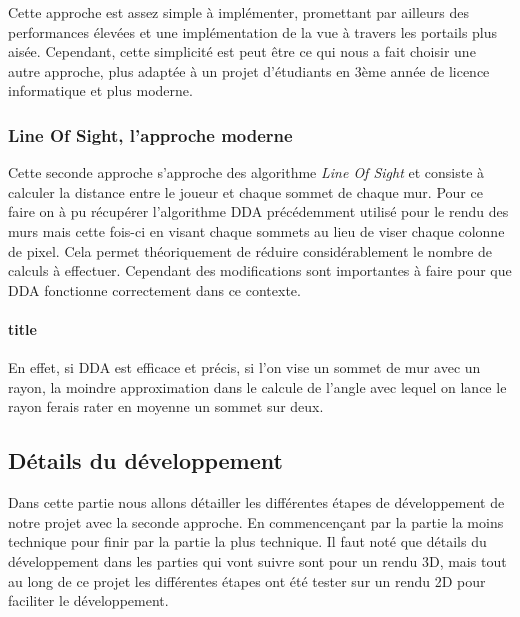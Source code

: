 \documentclass[12pt]{report}
\begin{document}
\noindent Cette approche est assez simple à implémenter, promettant par ailleurs des performances élevées et 
une implémentation de la vue à travers les portails plus aisée. Cependant, cette simplicité est peut être ce qui 
nous a fait choisir une autre approche, plus adaptée à un projet d'étudiants en 3ème année de licence informatique et plus moderne.

\subsubsection{Line Of Sight, l'approche moderne}

Cette seconde approche s'approche des algorithme \textit{Line Of Sight} et consiste à calculer la distance entre le joueur et chaque sommet de chaque mur.
Pour ce faire on à pu récupérer l'algorithme DDA précédemment utilisé pour le rendu des murs mais cette fois-ci 
en visant chaque sommets au lieu de viser chaque colonne de pixel. Cela permet théoriquement de réduire considérablement le nombre de calculs à effectuer.
Cependant des modifications sont importantes à faire pour que DDA fonctionne correctement dans ce contexte.

\paragraph{title}

En effet, si DDA est efficace et précis, si l'on vise un sommet de mur avec un rayon, la moindre approximation dans le calcule de l'angle avec lequel on 
lance le rayon ferais rater en moyenne un sommet sur deux.



\subsection{Détails du développement}
Dans cette partie nous allons détailler les différentes étapes de développement de notre projet avec la seconde approche. En commencençant par la partie la moins technique pour finir par la partie la plus technique. Il faut noté que détails du développement dans les parties qui vont suivre sont pour un rendu 3D, mais tout au long de ce projet les différentes étapes ont été tester sur un rendu 2D pour faciliter le développement.
\end{document}
